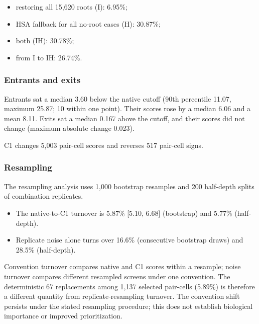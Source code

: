 \documentclass[11pt]{article}
\begin{document}
\begin{itemize}
\item restoring all 15,620 roots (I): 6.95\%;
\item HSA fallback for all no-root cases (H): 30.87\%;
\item both (IH): 30.78\%;
\item from I to IH: 26.74\%.
\end{itemize}
\subsubsection*{Entrants and exits} Entrants sat a median 3.60 below the native cutoff (90th percentile 11.07, maximum 25.87; 10 within one point). Their scores rose by a median 6.06 and a mean 8.11. Exits sat a median 0.167 above the cutoff, and their scores did not change (maximum absolute change 0.023).

C1 changes 5,003 pair-cell scores and reverses 517 pair-cell signs.

\subsubsection*{Resampling} The resampling analysis uses 1,000 bootstrap resamples and 200 half-depth splits of combination replicates.

\begin{itemize}
\item The native-to-C1 turnover is 5.87\% [5.10, 6.68] (bootstrap) and 5.77\% (half-depth).
\item Replicate noise alone turns over 16.6\% (consecutive bootstrap draws) and 28.5\% (half-depth).
\end{itemize}
Convention turnover compares native and C1 scores within a resample; noise turnover compares different resampled screens under one convention. The deterministic 67 replacements among 1,137 selected pair-cells (5.89\%) is therefore a different quantity from replicate-resampling turnover. The convention shift persists under the stated resampling procedure; this does not establish biological importance or improved prioritization.
\end{document}
